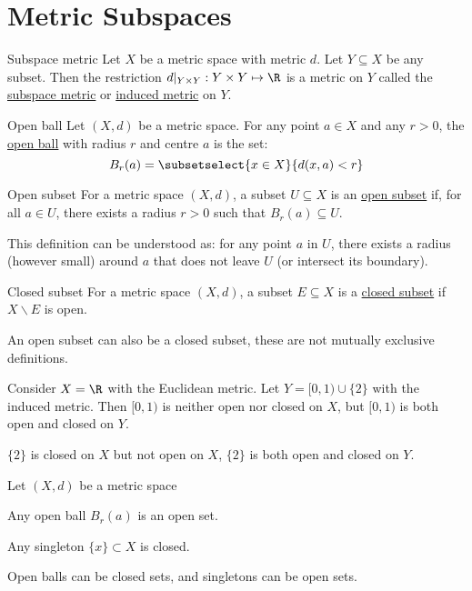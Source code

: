 \documentclass[../Main.tex]{subfiles}
\begin{document}
\section{Metric Subspaces}
\begin{definition}{Subspace metric}
    Let $X$ be a metric space with metric $d$. Let $Y\subseteq X$ be any subset. Then the restriction $d|_{Y \times Y} : Y \times Y \mapsto \R$ is a metric on $Y$ called the \underline{subspace metric} or \underline{induced metric} on $Y$.
\end{definition}
\begin{definition}{Open ball}
    Let $(X, d)$ be a metric space. For any point $a \in X$ and any $r > 0$, the \underline{open ball} with radius $r$ and centre $a$ is the set:
    \begin{equation*}
        B_r(a) = \subsetselect{x \in X}{d(x, a) < r}
    \end{equation*}
\end{definition}
\begin{definition}{Open subset}
    For a metric space $(X, d)$, a subset $U \subseteq X$ is an \underline{open subset} if, for all $a \in U$, there exists a radius $r > 0$ such that $B_r(a) \subseteq U$.
\end{definition}
\begin{remark}
    This definition can be understood as: for any point $a$ in $U$, there exists a radius (however small) around $a$ that does not leave $U$ (or intersect its boundary).
\end{remark}
\begin{definition}{Closed subset}
    For a metric space $(X, d)$, a subset $E \subseteq X$ is a \underline{closed subset} if $X \backslash E$ is open.
\end{definition}
\begin{remark}
    An open subset can also be a closed subset, these are not mutually exclusive definitions.
\end{remark}
\begin{example}
    Consider $X = \R$ with the Euclidean metric. Let $Y = [0, 1) \cup \{2\}$ with the induced metric.
    Then $[0, 1)$ is neither open nor closed on $X$, but $[0, 1)$ is both open and closed on $Y$.

    $\{2\}$ is closed on $X$ but not open on $X$, $\{2\}$ is both open and closed on $Y$.
\end{example}
\begin{propositions}{
        Let $(X, d)$ be a metric space
        \label{propsOpenSets}
    }
    \item Any open ball $B_r(a)$ is an open set.
    \item Any singleton $\{x\} \subset X$ is closed.
\end{propositions}
\begin{remark}
    Open balls can be closed sets, and singletons can be open sets.
\end{remark}
\end{document}
